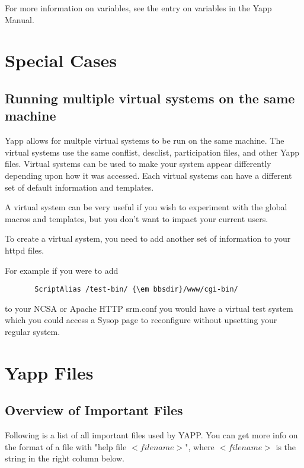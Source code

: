 \documentclass[twoside]{report}
\begin{document}
      For more information on variables, see the entry on variables in the 
      Yapp Manual.


\chapter{Special Cases} \label{c:specialcases}
   \section{Running multiple virtual systems on the same machine}
       
       Yapp allows for multple virtual systems to be run on the
       same machine.  The virtual systems use the same conflist, desclist,
       participation files, and other Yapp files.  Virtual systems can be
       used to make your system appear differently depending upon how
       it was accessed.  Each virtual systems can have a different set of 
       default information and templates.

       A virtual system can be very useful if you wish to experiment with
       the global macros and templates, but you don't want to impact your
       current users.

       To create a virtual system, you need to add another set of information
       to your httpd files.

       For example if you were to add

       \begin{verbatim}
       ScriptAlias /test-bin/ {\em bbsdir}/www/cgi-bin/
       \end{verbatim}

       to your NCSA or Apache HTTP srm.conf you would have a virtual test
       system which you could access a Sysop page to reconfigure without
       upsetting your regular system.

\chapter{Yapp Files}
   \section{Overview of Important Files}
      Following is a list of all important files used by YAPP.  You can get more
      info on the format of a file with "help file $<filename>$", where 
      $<filename>$ is the string in the right column below.
\end{document}
